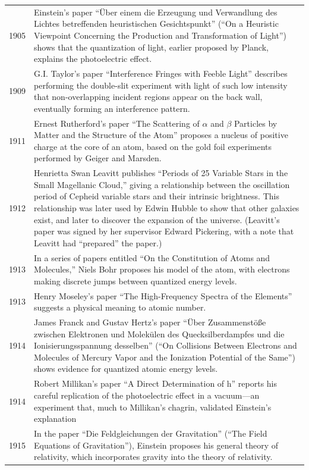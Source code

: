 \documentclass[../../../main.tex]{subfiles}
\begin{document}
\begin{center}
\begin{longtable}{p{}  p{}}
1905&Einstein's paper “Über einem die Erzeugung und Verwandlung des Lichtes betreffenden heuristischen Gesichtspunkt” (“On a Heuristic Viewpoint Concerning the Production and Transformation of Light”) shows that the quantization of light, earlier proposed by Planck, explains the photoelectric effect.\\
1909&G.I. Taylor's paper “Interference Fringes with Feeble Light” describes performing the double-slit experiment with light of such low intensity that non-overlapping incident regions appear on the back wall, eventually forming an interference pattern.\\
1911&Ernest Rutherford's paper “The Scattering of $\alpha$ and $\beta$ Particles by Matter and the Structure of the Atom” proposes a nucleus of positive charge at the core of an atom, based on the gold foil experiments performed by Geiger and Marsden.\\
1912&Henrietta Swan Leavitt publishes “Periods of 25 Variable Stars in the Small Magellanic Cloud,” giving a relationship between the oscillation period of Cepheid variable stars and their intrinsic brightness. This relationship was later used by Edwin Hubble to show that other galaxies exist, and later to discover the expansion of the universe. (Leavitt's paper was signed by her supervisor Edward Pickering, with a note that Leavitt had “prepared” the paper.)\\
1913&In a series of papers entitled “On the Constitution of Atoms and Molecules,” Niels Bohr proposes his model of the atom, with electrons making discrete jumps between quantized energy levels.\\
1913&Henry Moseley's paper “The High-Frequency Spectra of the Elements” suggests a physical meaning to atomic number. \\
1914&James Franck and Gustav Hertz's paper “Über Zusammenstöße zwischen Elektronen und Molekülen des Quecksilberdampfes und die Ionisierungsspannung desselben” (“On Collisions Between Electrons and Molecules of Mercury Vapor and the Ionization Potential of the Same”) shows evidence for quantized atomic energy levels.\\
1914&Robert Millikan's paper “A Direct Determination of h” reports his careful replication of the photoelectric effect in a vacuum—an experiment that, much to Millikan's chagrin, validated Einstein's explanation\\
1915&In the paper “Die Feldgleichungen der Gravitation” (“The Field Equations of Gravitation”), Einstein proposes his general theory of relativity, which incorporates gravity into the theory of relativity.\\

\end{longtable}
\end{center}
\end{document}
